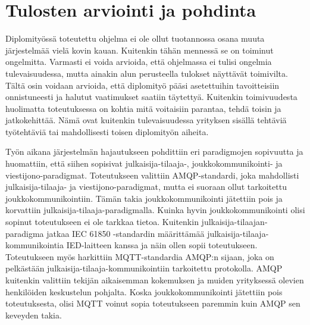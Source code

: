 \chapter{Tulosten arviointi ja pohdinta}
\label{ch:arviointi}
Diplomityössä toteutettu ohjelma ei ole ollut tuotannossa osana muuta järjestelmää vielä kovin kauan. Kuitenkin tähän mennessä se on toiminut ongelmitta. Varmasti ei voida arvioida, että ohjelmassa ei tulisi ongelmia tulevaisuudessa, mutta ainakin alun perusteella tulokset näyttävät toimivilta. Tältä osin voidaan arvioida, että diplomityö pääsi asetettuihin tavoitteisiin onnistuneesti ja halutut vaatimukset saatiin täytettyä. Kuitenkin toimivuudesta huolimatta toteutuksessa on kohtia mitä voitaisiin parantaa, tehdä toisin ja jatkokehittää. Nämä ovat kuitenkin tulevaisuudessa yrityksen sisällä tehtäviä työtehtäviä tai mahdollisesti toisen diplomityön aiheita.

Työn aikana järjestelmän hajautukseen pohdittiin eri paradigmojen sopivuutta ja huomattiin, että siihen sopisivat julkaisija-tilaaja-, joukkokommunikointi- ja viestijono-pa\-ra\-dig\-mat. Toteutukseen valittiin AMQP-standardi, joka mahdollisti julkaisija-tilaaja- ja viestijono-pa\-ra\-dig\-mat, mutta ei suoraan ollut tarkoitettu joukkokommunikointiin. Tämän takia joukkokommunikointi jätettiin pois ja korvattiin julkaisija-tilaaja-paradigmalla. Kuinka hyvin joukkokommunikointi olisi sopinut toteutukseen ei ole tarkkaa tietoa. Kuitenkin julkaisija-tilaajan-paradigma jatkaa IEC 61850 -standardin määrittämää julkaisija-tilaaja-kom\-mu\-ni\-koin\-ti\-a IED-laitteen kanssa ja näin ollen sopii toteutukseen. Toteutukseen myös harkittiin MQTT-standardia AMQP:n sijaan, joka on pelkästään julkaisija-tilaaja-kom\-mu\-ni\-koin\-tiin tarkoitettu protokolla. AMQP kuitenkin valittiin tekijän aikaisemman kokemuksen ja muiden yrityksessä olevien henkilöiden keskustelun pohjalta. Koska joukkokommunikointi jätettiin pois toteutuksesta, olisi MQTT voinut sopia toteutukseen paremmin kuin AMQP sen keveyden takia.

